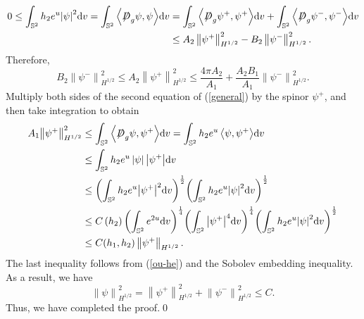 \documentclass[a4paper, 12pt]{article}
\def\slashiii#1{\setbox0=\hbox{$#1$}#1\hskip-\wd0\hbox to\wd0{\hss\sl/\/\hss}}
\begin{document}
\[\begin{aligned}
	0 \leq \int_{{\mathbb{S}^2}} h_2{{e^u}} {\left| \psi  \right|^2}{\text{d}}v = \int_{{\mathbb{S}^2}} {\left\langle {\slashiii{D}_g\psi ,\psi } \right\rangle } {\text{d}}v &= \int_{{{\mathbb{S}^2}}} {\left\langle {\slashiii{D}_g{\psi ^ + },{\psi ^ + }} \right\rangle } {\text{d}}v + \int_{{{\mathbb{S}^2}}} {\left\langle {\slashiii{D}_g{\psi ^ - },{\psi ^ - }} \right\rangle } {\text{d}}v  \\
	&\leq {A_2}\left\| {{\psi ^ + }} \right\|_{{H^{1/2}}}^2 - {B_2}\left\| {{\psi ^ - }} \right\|_{{H^{1/2}}}^2.
\end{aligned} \]
Therefore,
\begin{equation}\label{pos-neg}
	B_2{\left\| {{\psi ^ - }} \right\|^2_{{H^{1/2}}}} \leq A_2{\left\| {{\psi ^ + }} \right\|^2_{{H^{1/2}}}} \leq \frac{4\pi A_2}{A_1}  + \frac{A_2B_1}{A_1}{\left\| {{\psi ^ - }} \right\|^2_{{H^{1/2}}}}.
\end{equation}
Multiply both sides of the second equation of (\ref{general}) by the spinor $\psi^+$, and then take integration to obtain
\begin{equation}\label{nonlinear}
	\begin{aligned}
		A_1{\left\| {{\psi ^ + }} \right\|^2_{{H^{1/2}}}}  &\leq \int_{{{\mathbb{S}^2}}} {\left\langle {\slashiii{D}_g\psi ,{\psi ^ + }} \right\rangle } {\text{d}}v = \int_{{\mathbb{S}^2}}h_2 {{e^{u}}\left\langle {\psi ,{\psi ^ + }} \right\rangle } {\text{d}{v}} \\
		&\leq\int_{{\mathbb{S}^2}}h_2 {{e^{u}}\left| \psi  \right|\left| {{\psi ^ + }} \right|} {\text{d}{v}} \\
		&\leq {\left( {\int_{{\mathbb{S}^2}} h_2{{e^{u}}} {{\left| {{\psi ^ + }} \right|}^2}{\text{d}{v}}} \right)^{\frac{1}{2}}}{\left( {\int_{{\mathbb{S}^2}}h_2 {{e^{u}}{{\left| \psi  \right|}^2}} {\text{d}{v}}} \right)^{\frac{1}{2}}} \\
		&\leq C\left( h_2\right) {\left( {\int_{{\mathbb{S}^2}} {{e^{2u}}} {\text{d}{v}}} \right)^{\frac{1}{4}}}{\left( {\int_{{\mathbb{S}^2}} {{{\left| {{\psi ^ + }} \right|}^4}{\text{d}{v}}} } \right)^{\frac{1}{4}}}{\left( {\int_{{\mathbb{S}^2}}h_2 {{e^{u}}{{\left| \psi  \right|}^2}} {\text{d}{v}}} \right)^{\frac{1}{2}}} \\
		&\leq C(h_1,h_2)\left\| {{\psi ^ + }} \right\|_{{H^{1/2}}}.
	\end{aligned}
\end{equation}
The last inequality follows from (\ref{ou-he}) and the Sobolev embedding inequality. As a result, we have
\begin{equation*}
	{\left\| \psi  \right\|^2_{{H^{1/2}}}}=\left\| {{\psi ^ + }} \right\|_{{H^{1/2}}}^2 + \left\| {{\psi ^ - }} \right\|_{{H^{1/2}}}^2 \leq C.
\end{equation*}
Thus, we have completed the proof.\qed
\end{document}
